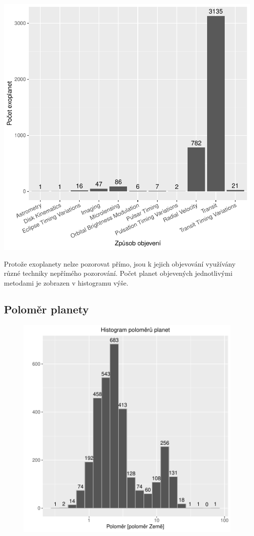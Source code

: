 \documentclass[a4paper,12pt]{article}
\begin{document}
\begin{center}

\includegraphics{exoplanety-discmethod}

\end{center}

Protože exoplanety nelze pozorovat přímo, jsou k jejich objevování využívány různé techniky nepřímého pozorování. Počet planet objevených jednotlivými metodami je zobrazen v histogramu výše.

\newpage
\subsection{Poloměr planety}
\begin{figure}[!htb]
\centering
\includegraphics{exoplanety-003}
\end{figure}
\end{document}

